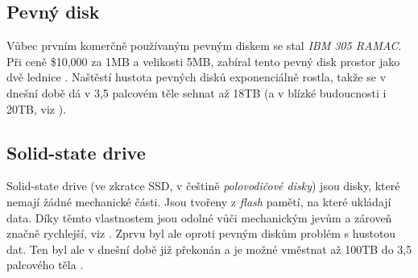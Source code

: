 \documentclass[11pt]{article}
\begin{document}
    \subsection*{Pevný disk}
    Vůbec prvním komerčně používaným pevným diskem se stal \emph{IBM 305 RAMAC}. Při ceně \$10,000 za 1MB a velikosti 5MB, zabíral tento pevný disk prostor jako dvě lednice \cite{pcmagHDD}. Naštěstí hustota pevných disků exponenciálně rostla, takže se v dnešní době dá v 3,5 palcovém těle sehnat až 18TB (a v blízké budoucnosti i 20TB, viz \cite{pcmag20}).
    
    \subsection*{Solid-state drive}
    Solid-state drive (ve zkratce SSD, v češtině \emph{polovodičové disky}) jsou disky, které nemají žádné mechanické části. Jsou tvořeny z \emph{flash} pamětí, na které ukládají data. Díky těmto vlastnostem jsou odolné vůči mechanickým jevům a zároveň značně rychlejší, viz \cite{KotekJan2010Sd}. Zprvu byl ale oproti pevným diskům problém s hustotou dat. Ten byl ale v dnešní době již překonán a je možné vměstnat až 100TB do 3,5 palcového těla \cite{techradar100}.
    
    \pagebreak
    
    \printbibliography
\end{document}
